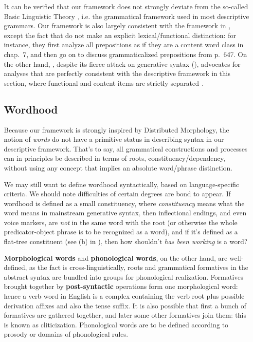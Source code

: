 \documentclass[UTF8, a4paper, oneside, scheme=plain, 12pt]{ctexrep}
\newcommand*{\citechap}[1]{chap.~{#1}}
\newcommand*{\citepage}[1]{p.~{#1}}
\newcommand*{\concept}[1]{\textbf{#1}}
\newcommand*{\term}[1]{\emph{#1}}
\newcommand{\form}[1]{\emph{#1}}
\begin{document}
{It can be verified that our framework does not strongly deviate from the so-called Basic Linguistic Theory
\citep{dixon2009basic},
i.e. the grammatical framework used in most descriptive grammars.
Our framework is also largely consistent with the framework in \citet{cgel},
except the fact that \citet{cgel} do not make an explicit lexical/functional distinction:
for instance, they first analyze all prepositions as if they are a content word class
in \citechap{7},
and then go on to discuss grammaticalized prepositions from \citepage{647}.
On the other hand, \citet{dixon2009basic}, despite its fierce attack on generative syntax
(),
advocates for analyses that are perfectly consistent with the descriptive framework in this section,
where functional and content items are strictly separated
\citep[\citepage{49}]{dixon2009basic}.

\subsection{Wordhood}\label{sec:intro.theory.word}

Because our framework is strongly inspired by Distributed Morphology,
the notion of \term{words} do not have a primitive status
in describing syntax in our descriptive framework.
That's to say, all grammatical constructions and processes
can in principles be described in terms of roots, constituency/dependency,
without using any concept that implies an absolute word/phrase distinction.

We may still want to define wordhood syntactically,
based on language-specific criteria.
We should note difficulties of certain degrees are bond to appear.
If wordhood is defined as a small constituency, where \term{constituency} means what the word means in mainstream generative syntax,
then inflectional endings, and even voice markers,
are \emph{not} in the same word with the root
(or otherwise the whole predicator-object phrase is to be recognized as a word),
and if it's defined as a flat-tree constituent (see (b) in ),
then how shouldn't \form{has been working} is a word?

\concept{Morphological words} and \concept{phonological words},
on the other hand, are well-defined, as the fact is cross-linguistically,
roots and grammatical formatives in the abstract syntax are bundled into groups for phonological realization.
Formatives brought together by \concept{post-syntactic} operations form one morphological word:
hence a verb word in English is a complex containing
the verb root plus possible derivation affixes and also the tense suffix.
It is also possible that first a bunch of formatives are gathered together,
and later some other formatives join them:
this is known as cliticization.
Phonological words are to be defined according to prosody
or domains of phonological rules.

}
\end{document}
